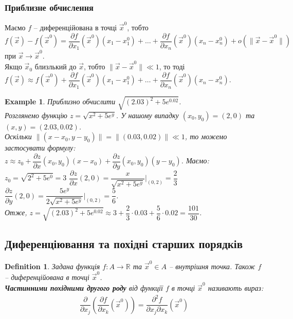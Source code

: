 \documentclass[a4paper, 10pt]{article}
\def\departial#1#2{\dfrac{\partial {#1}}{\partial {#2}}}
\theoremstyle{theoremdd}
\theoremstyle{theoremdd}
\theoremstyle{theoremdd}
\newtheorem{definition}[theorem]{Definition}
\theoremstyle{theoremdd}
\theoremstyle{theoremdd}
\newtheorem{example}[theorem]{Example}
\theoremstyle{theoremdd}
\theoremstyle{theoremdd}
\theoremstyle{theoremdd}
\theoremstyle{theoremdd}
\newcommand\Norm[1]{\|#1\|}
\begin{document}
\subsubsection{Приблизне обчислення}
Маємо $f$ -- диференційована в точці $\vec{x}^0$, тобто\\
$f(\vec{x}) - f(\vec{x}^0) = \departial{f}{x_1}(\vec{x}^0)(x_1-x_1^0) + \dots + \departial{f}{x_n}(\vec{x}^0)(x_n-x_n^0) + o(\Norm{\vec{x}-\vec{x}^0})$ при $\vec{x} \to \vec{x}^0$.\\
Якщо $\vec{x}_0$ близлький до $\vec{x}$, тобто $\Norm{\vec{x} - \vec{x}^0} \ll 1$, то тоді\\
$f(\vec{x}) \approx f(\vec{x}^0) + \departial{f}{x_1}(\vec{x}^0)(x_1-x_1^0) + \dots + \departial{f}{x_n}(\vec{x}^0)(x_n-x_n^0)$.

\begin{example}
Приблизно обчислити $\sqrt{(2.03)^2 + 5e^{0.02}}$.\\
Розглянемо функцію $z = \sqrt{x^2+5e^y}$. У нашому випадку $(x_0,y_0) = (2,0)$ та $(x,y) = (2.03,0.02)$.\\
Оскільки $\Norm{(x-x_0,y-y_0)} = \Norm{(0.03,0.02)} \ll 1$, то можемо застосувати формулу:\\
$z \approx z_0 + \departial{z}{x}(x_0,y_0)(x-x_0) + \departial{z}{y}(x_0,y_0)(y-y_0)$. Маємо: \\ $z_0 = \sqrt{2^2+5e^0} = 3$ \hspace{1cm} $\departial{z}{x}(2,0) = \dfrac{x}{\sqrt{x^2+5e^y}} \Big|_{(0,2)} = \dfrac{2}{3}$ \hspace{1cm} $\departial{z}{y}(2,0) = \dfrac{5e^y}{2\sqrt{x^2+5e^y}} \Big|_{(0,2)} = \dfrac{5}{6}$.\\
Отже, $z = \sqrt{(2.03)^2 + 5e^{0.02}} \approx 3 + \dfrac{2}{3} \cdot 0.03 + \dfrac{5}{6} \cdot 0.02 = \dfrac{101}{30}$.
\end{example}
\fi

\subsection{Диференціювання та похідні старших порядків}
\begin{definition}
Задана функція $f\colon A \to \mathbb{R}$ та $\vec{x}^0 \in A$ -- внутрішня точка. Також $f$ -- диференційована в точці $\vec{x}^0$.\\
\textbf{Частинними похідними другого роду} від функції $f$ в точці $\vec{x}^0$ називають вираз:
\begin{align*}
\dfrac{\partial}{\partial x_j} \left( \dfrac{\partial f}{\partial x_k} (\vec{x}^0) \right) = \dfrac{\partial^2 f}{\partial x_j \partial x_k} (\vec{x}^0)
\end{align*}
\end{definition}
\end{document}
